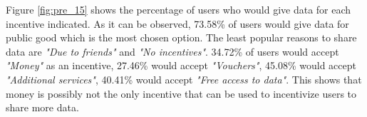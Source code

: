 Figure \ref{fig:pre_15} shows the percentage of users who would give data for each incentive indicated. As it can be observed, 73.58\% of users would give data for public good which is the most chosen option. The least popular reasons to share data are \textit{"Due to friends"} and \textit{"No incentives"}. 34.72\% of users would accept \textit{"Money"} as an incentive, 27.46\% would accept \textit{"Vouchers"}, 45.08\% would accept \textit{"Additional services"}, 40.41\% would accept \textit{"Free access to data"}. This shows that money is possibly not the only incentive that can be used to incentivize users to share more data.


\begin{figure}[htp]
\hspace{1em}
\newline
{}\hspace{1em}

\end{figure}
